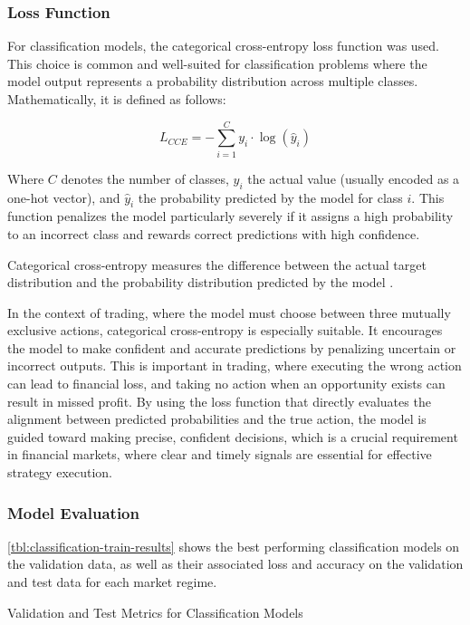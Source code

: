 \subsubsection{Loss Function}

For classification models, the categorical cross-entropy loss function was used.
This choice is common and well-suited for classification problems where the model output represents a probability distribution across multiple classes.
Mathematically, it is defined as follows:

\[
    L_{CCE} = -\sum_{i=1}^{C} y_i \cdot \log(\hat{y}_i)
\]

\noindent
Where $C$ denotes the number of classes, $y_i$ the actual value (usually encoded as a one-hot vector), and $\hat{y}_i$ the probability predicted by the model for class $i$.
This function penalizes the model particularly severely if it assigns a high probability to an incorrect class and rewards correct predictions with high confidence.

Categorical cross-entropy measures the difference between the actual target distribution and the probability distribution predicted by the model \cite{springer-ml-basics}.

In the context of trading, where the model must choose between three mutually exclusive actions, categorical cross-entropy is especially suitable.
It encourages the model to make confident and accurate predictions by penalizing uncertain or incorrect outputs.
This is important in trading, where executing the wrong action can lead to financial loss, and taking no action when an opportunity exists can result in missed profit.
By using the loss function that directly evaluates the alignment between predicted probabilities and the true action, the model is guided toward making precise, confident decisions, which is a crucial requirement in financial markets, where clear and timely signals are essential for effective strategy execution.

\subsubsection{Model Evaluation}

\autoref{tbl:classification-train-results} shows the best performing classification models on the validation data, as well as their associated loss and accuracy on the validation and test data for each market regime.

\begin{table}[H]
    \centering
    
    \caption{Validation and Test Metrics for Classification Models}
    \label{tbl:classification-train-results}
\end{table}

